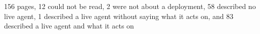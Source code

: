 156 pages, 12 could not be read, 2 were not about a deployment, 58 described no live agent, 1 described a live agent without saying what it acts on, and 83 described a live agent and what it acts on